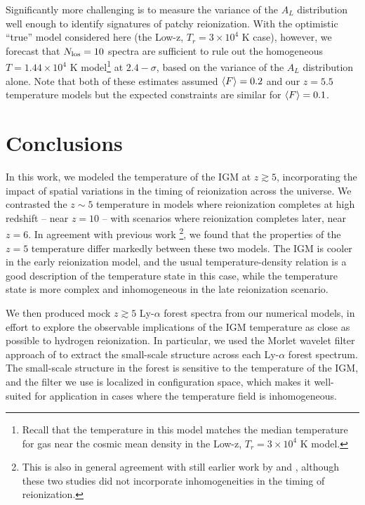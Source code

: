 Significantly more challenging is to measure the variance of the $A_L$ distribution well enough to identify signatures of patchy
reionization. With the optimistic ``true'' model considered here (the Low-z, $T_r=3 \times 10^4$ K case), however, we forecast that
$N_{\rm los}=10$ spectra are sufficient to rule out the homogeneous $T=1.44 \times 10^4$ K model\footnote{Recall that the temperature in this model matches the median temperature for gas near the cosmic mean density in the Low-z, $T_r=3 \times 10^4$ K model.} at $2.4-\sigma$, based on the variance of the $A_L$ distribution alone. Note that both of these estimates assumed $\langle F \rangle=0.2$ and our $z=5.5$ temperature models but the
expected constraints are similar for $\langle F \rangle=0.1$.

  

\section{Conclusions}
\label{sec:IGMTemperatureconclusions}

In this work, we modeled the temperature of the IGM at $z \gtrsim 5$, incorporating the impact of spatial
variations in the timing of reionization across the universe. We contrasted the $z \sim 5$ temperature in models
where reionization completes at high redshift -- near $z=10$ -- with scenarios where reionization completes
later, near $z = 6$. In agreement with previous work \citep{Trac:2008yz,Furlanetto:2009kr}\footnote{This is also
in general agreement with still earlier work by 
\citealt{Theuns:2002yc} and \citealt{Hui:2003hn}, although these two studies did not incorporate inhomogeneities in the
timing of reionization.}, we found
that the properties of the $z=5$ temperature differ markedly between these two models. The IGM is cooler in the
early reionization model, and the usual temperature-density relation is a good description of the temperature
state in this case, while the temperature state is more complex and inhomogeneous in the late reionization scenario.

We then produced mock $z \gtrsim 5$ Ly-$\alpha$ forest spectra from our numerical models, in effort to explore
the observable implications of the IGM temperature as close as possible to hydrogen reionization. In particular,
we used the Morlet wavelet filter approach of \citet{Lidz:2009ca} to extract the small-scale structure across
each Ly-$\alpha$ forest spectrum. The small-scale structure in the forest is sensitive to the temperature of the IGM,
and the filter we use is localized in configuration space, which makes it well-suited for application in cases
where the temperature field is inhomogeneous. 

